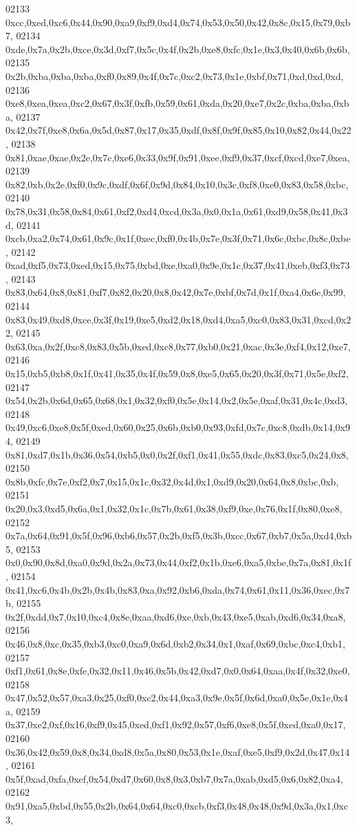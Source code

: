 \begin{DoxyCode}
02133   0xcc,0xed,0xc6,0x44,0x90,0xa9,0xf9,0xd4,0x74,0x53,0x50,0x42,0x8c,0x15,0x79,0xb7,
02134   0xde,0x7a,0x2b,0xce,0x3d,0xf7,0x5c,0x4f,0x2b,0xe8,0xfc,0x1e,0x3,0x40,0x6b,0x6b,
02135   0x2b,0xba,0xba,0xba,0xf0,0x89,0x4f,0x7c,0xc2,0x73,0x1e,0xbf,0x71,0xd,0xd,0xd,
02136   0xe8,0xea,0xea,0xc2,0x67,0x3f,0xfb,0x59,0x61,0xda,0x20,0xe7,0x2c,0xba,0xba,0xba,
02137   0x42,0x7f,0xe8,0x6a,0x5d,0x87,0x17,0x35,0xdf,0x8f,0x9f,0x85,0x10,0x82,0x44,0x22,
02138   0x81,0xae,0xae,0x2e,0x7c,0xe6,0x33,0x9f,0x91,0xee,0xf9,0x37,0xcf,0xcd,0xe7,0xea,
02139   0x82,0xb,0x2e,0xf0,0x9c,0xdf,0x6f,0x9d,0x84,0x10,0x3c,0xf8,0xe0,0x83,0x58,0xbc,
02140   0x78,0x31,0x58,0x84,0x61,0xf2,0xd4,0xcd,0x3a,0x0,0x1a,0x61,0xd9,0x58,0x41,0x3d,
02141   0xcb,0xa2,0x74,0x61,0x9c,0x1f,0xec,0xf0,0x4b,0x7e,0x3f,0x71,0x6c,0xbc,0x8c,0xbe,
02142   0xad,0xf5,0x73,0xed,0x15,0x75,0xbd,0xe,0xa0,0x9e,0x1c,0x37,0x41,0xeb,0xf3,0x73,
02143   0x83,0x64,0x8,0x81,0xf7,0x82,0x20,0x8,0x42,0x7e,0xbf,0x7d,0x1f,0xa4,0x6e,0x99,
02144   0x83,0x49,0xd8,0xce,0x3f,0x19,0xe5,0xd2,0x18,0xd4,0xa5,0xc0,0x83,0x31,0xcd,0x22,
02145   0x63,0xa,0x2f,0xc8,0x83,0x5b,0xed,0xc8,0x77,0xb0,0x21,0xac,0x3e,0xf4,0x12,0xe7,
02146   0x15,0xb5,0xb8,0x1f,0x41,0x35,0x4f,0x59,0x8,0xe5,0x65,0x20,0x3f,0x71,0x5e,0xf2,
02147   0x54,0x2b,0x6d,0x65,0x68,0x1,0x32,0xf0,0x5e,0x14,0x2,0x5e,0xaf,0x31,0x4c,0xd3,
02148   0x49,0xc6,0xe8,0x5f,0xed,0x60,0x25,0x6b,0xb0,0x93,0xfd,0x7c,0xc8,0xdb,0x14,0x94,
02149   0x81,0xd7,0x1b,0x36,0x54,0xb5,0x0,0x2f,0xf1,0x41,0x55,0xdc,0x83,0xc5,0x24,0x8,
02150   0x8b,0xfc,0x7e,0xf2,0x7,0x15,0x1c,0x32,0x4d,0x1,0xd9,0x20,0x64,0x8,0xbc,0xb,
02151   0x20,0x3,0xd5,0x6a,0x1,0x32,0x1c,0x7b,0x61,0x38,0xf9,0xe,0x76,0x1f,0x80,0xe8,
02152   0x7a,0x64,0x91,0x5f,0x96,0xb6,0x57,0x2b,0xf5,0x3b,0xcc,0x67,0xb7,0x5a,0xd4,0xb5,
02153   0x0,0x90,0x8d,0xa0,0x9d,0x2a,0x73,0x44,0xf2,0x1b,0xe6,0xa5,0xbe,0x7a,0x81,0x1f,
02154   0x41,0xc6,0x4b,0x2b,0x4b,0x83,0xa,0x92,0xb6,0xda,0x74,0x61,0x11,0x36,0xec,0x7b,
02155   0x2f,0xdd,0x7,0x10,0xc4,0x8e,0xaa,0xd6,0xe,0xb,0x43,0xe5,0xab,0xd6,0x34,0xa8,
02156   0x46,0x8,0xc,0x35,0xb3,0xc0,0xa9,0x6d,0xb2,0x34,0x1,0xaf,0x69,0xbc,0xc4,0xb1,
02157   0xf1,0x61,0x8e,0xfe,0x32,0x11,0x46,0x5b,0x42,0xd7,0x0,0x64,0xaa,0x4f,0x32,0xe0,
02158   0x47,0x52,0x57,0xa3,0x25,0xf0,0xc2,0x44,0xa3,0x9e,0x5f,0x6d,0xa0,0x5e,0x1e,0x4a,
02159   0x37,0xe2,0xf,0x16,0xf9,0x45,0xed,0xf1,0x92,0x57,0xf6,0xe8,0x5f,0xed,0xa0,0x17,
02160   0x36,0x42,0x59,0x8,0x34,0xd8,0x5a,0x80,0x53,0x1e,0xaf,0xe5,0xf9,0x2d,0x47,0x14,
02161   0x5f,0xad,0xfa,0xef,0x54,0xd7,0x60,0x8,0x3,0xb7,0x7a,0xab,0xd5,0x6,0x82,0xa4,
02162   0x91,0xa5,0xbd,0x55,0x2b,0x64,0x64,0xc0,0xcb,0xf3,0x48,0x48,0x9d,0x3a,0x1,0xc3,

\end{DoxyCode}
